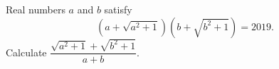Real numbers $a$ and $b$ satisfy
\[
\left(a+\sqrt{a^2+1}\right)\left(b+\sqrt{b^2+1}\right)=2019 .
\]
Calculate $\dfrac{\sqrt{a^2+1}+\sqrt{b^2+1}}{a+b}$.
